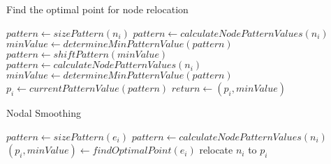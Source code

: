 \begin{algorithm}
\begin{algorithmic}
\caption{Find the optimal point for node relocation}
\label{alg_NodeSmoothing}
 
  \State $pattern \gets sizePattern\left( n_i \right)$
  \State $pattern \gets calculateNodePatternValues\left( n_i \right)$
  \State $minValue \gets determineMinPatternValue\left( pattern \right)$
    \State $pattern \gets shiftPattern\left( minValue \right)$
    \State $pattern \gets calculateNodePatternValues\left( n_i \right)$
    \State $minValue \gets determineMinPatternValue\left( pattern \right)$
  \EndWhile
  \State $p_i \gets currentPatternValue\left( pattern \right)$
  \State $return \gets \left( p_i, minValue \right)$
\EndProcedure
\end{algorithmic}
\end{algorithm}

\begin{algorithm}[H]
\caption{Nodal Smoothing}
\begin{algorithmic}
 
    \State $pattern \gets sizePattern\left( e_i \right)$
    \State $pattern \gets calculateNodePatternValues\left( n_i \right)$
    \State $\left( p_i, minValue \right) \gets findOptimalPoint\left( e_i \right)$
  \EndFor
    \State relocate $n_i$ to $p_i$
  \EndIf
\EndProcedure
\end{algorithmic}
\end{algorithm}
